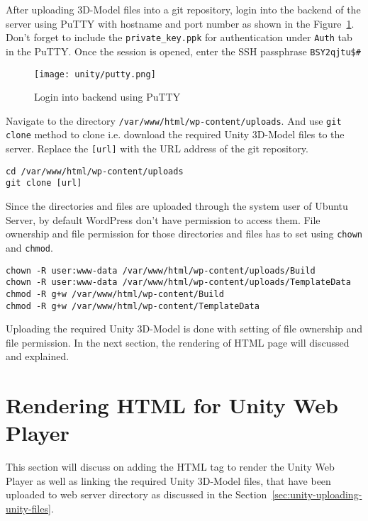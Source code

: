 After uploading 3D-Model files into a git repository, login into the backend of the server using PuTTY with hostname and port number as shown in the Figure~\ref{fig:login-putty}. Don't forget to include the \texttt{private\_key.ppk} for authentication under \texttt{Auth} tab in the PuTTY. Once the session is opened, enter the SSH passphrase \texttt{BSY2qjtu\$\#}

\begin{figure}[h]
\caption{Login into backend using PuTTY}
\label{fig:login-putty}
\centering
\texttt{[image: unity/putty.png]}
\end{figure}

Navigate to the directory \texttt{/var/www/html/wp-content/uploads}. And use \texttt{git clone} method to clone i.e. download the required Unity 3D-Model files to the server. Replace the \texttt{[url]} with the URL address of the git repository.

\begin{lstlisting}
cd /var/www/html/wp-content/uploads
git clone [url]
\end{lstlisting}

Since the directories and files are uploaded through the system user of Ubuntu Server, by default WordPress don't have permission to access them. File ownership and file permission for those directories and files has to set using \texttt{chown} and \texttt{chmod}.

\begin{lstlisting}
chown -R user:www-data /var/www/html/wp-content/uploads/Build
chown -R user:www-data /var/www/html/wp-content/uploads/TemplateData
chmod -R g+w /var/www/html/wp-content/Build
chmod -R g+w /var/www/html/wp-content/TemplateData
\end{lstlisting}

Uploading the required Unity 3D-Model is done with setting of file ownership and file permission. In the next section, the rendering of HTML page will discussed and explained.

\section{Rendering HTML for Unity Web Player} \label{sec:unity-rendering-html-for-unity}
This section will discuss on adding the HTML tag to render the Unity Web Player as well as linking the required Unity 3D-Model files, that have been uploaded to web server directory as discussed in the Section~\ref{sec:unity-uploading-unity-files}.

